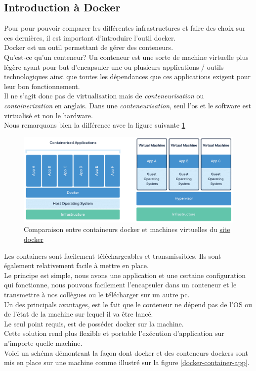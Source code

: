 \documentclass[
    iai, %
    il, %
]{heig-tb}
\begin{document}
\subsection{Introduction à Docker}
Pour pour pouvoir comparer les différentes infrastructures et faire des choix sur ces dernières, il est important d'introduire l'outil \Gls{docker}.\\
Docker est un outil permettant de gérer des conteneurs.\\
Qu'est-ce qu'un conteneur? Un \Gls{conteneur} est une sorte de machine virtuelle plus légère ayant pour but d'encapsuler une ou plusieurs applications / outils technologiques ainsi que toutes les dépendances que ces applications exigent pour leur bon fonctionnement.\\
Il ne s'agit donc pas de virtualisation mais de \emph{conteneurisation} ou \emph{containerization} en anglais.
Dans une \emph{conteneurisation}, seul l'\Gls{os} et le software est virtualisé et non le hardware.\\
Nous remarquons bien la différence avec la figure suivante \ref{docker-compare}

\begin{center}
    \begin{figure}
        \includegraphics[width=\textwidth]{./assets/figures/docker-containerized-and-vm.png}
        \caption[Comparaison Docker vs VM]{Comparaison entre containeurs docker et machines virtuelles
            du \href{https://www.docker.com/wp-content/uploads/2021/11/}{site docker}
            \label{docker-compare}}
    \end{figure}
\end{center}

Les containers sont facilement téléchargeables et transmissibles. Ils sont également relativement facile à mettre en place.\\
Le principe est simple, nous avons une application et une certaine configuration qui fonctionne, nous pouvons facilement l'encapsuler dans un conteneur et le transmettre à nos collègues ou le télécharger sur un autre pc.\\
Un des principals avantages, est le fait que le conteneur ne dépend pas de l'OS ou de l'état de la machine sur lequel il va être lancé.\\
Le seul point requis, est de posséder docker sur la machine.\\
Cette solution rend plus flexible et portable l'exécution d'application sur n'importe quelle machine.\\
Voici un schéma démontrant la façon dont docker et des conteneurs dockers sont mis en place sur une
machine comme illustré sur la figure \ref{docker-container-app}.
\end{document}
